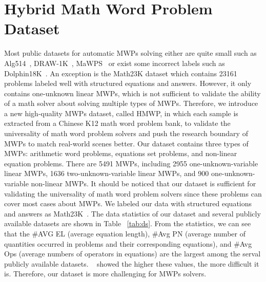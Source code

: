 \documentclass[11pt,a4paper]{article}
\begin{document}
\section{Hybrid Math Word Problem Dataset}
Most public datasets for automatic MWPs solving either are quite small such as Alg514~\cite{kushman2014learning}, DRAW-1K~\cite{upadhyay2017annotating}, MaWPS~\cite{koncel2016mawps} or exist some incorrect labels such as Dolphin18K~\cite{huang-etal-2016-well}. An exception is the Math23K dataset which contains 23161 problems labeled well with structured equations and answers. However, it only contains one-unknown linear MWPs, which is not sufficient to validate the ability of a math solver about solving multiple types of MWPs. Therefore, we introduce a new high-quality MWPs dataset, called HMWP, in which each sample is extracted from a Chinese K12 math word problem bank, to validate the universality of math word problem solvers and push the research boundary of MWPs to match real-world scenes better. Our dataset contains three types of MWPs: arithmetic word problems, equations set problems, and non-linear equation problems. There are 5491 MWPs, including 2955 one-unknown-variable linear MWPs, 1636 two-unknown-variable linear MWPs, and 900 one-unknown-variable non-linear MWPs. It should be noticed that our dataset is sufficient for validating the universality of math word problem solvers since these problems can cover most cases about MWPs. We labeled our data with structured equations and answers as Math23K~\cite{dns}. The data statistics of our dataset and several publicly available datasets are shown in Table ~\ref{tab:ds}. From the statistics, we can see that the \#AVG EL (average equation length), \#Avg PN (average number of quantities occurred in problems and their corresponding equations), and \#Avg Ops (average numbers of operators in equations) are the largest among the serval publicly available datasets. ~\cite{seq2tree} showed the higher these values, the more difficult it is. Therefore, our dataset is more challenging for MWPs solvers. 
\end{document}
